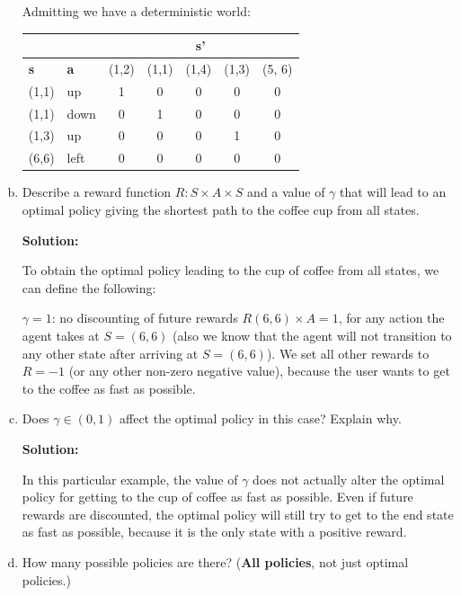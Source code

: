 \documentclass[12pt]{article}
\begin{document}
\begin{enumerate}[a)]
Admitting we have a deterministic world:

  \begin{center}
    \begin{tabular}{|l|l|c|c|c|c|c|}\hline
      \multicolumn{2}{|c|}{} &
                               \multicolumn{5}{|c|}{\textbf{s'}}\\\hline
      \textbf{s} & \textbf{a} & (1,2) & (1,1) & (1,4) & (1,3) & (5, 6)\\\hline
      (1,1) & up & 1 & 0 & 0 & 0 & 0 \\ \hline
      (1,1) & down & 0 & 1 & 0 & 0 & 0 \\ \hline
      (1,3) & up & 0 & 0 & 0 & 1 & 0 \\ \hline
      (6,6) & left & 0 & 0 & 0 & 0 & 0 \\ \hline
    \end{tabular}
  \end{center}

\item Describe a reward function $R : S \times A \times S$ 
  and a value of $\gamma$ that
  will lead to an optimal policy giving the shortest path to the coffee cup from
  all states.

\textbf{Solution:}

To obtain the optimal policy leading to the cup of coffee from all states, we can define the following:

$\gamma=1$: no discounting of future rewards
$R (6,6) \times A =1$, for any action the agent takes at $S=(6,6)$ (also we know that the agent will not transition to any other state after arriving at  $S=(6,6)$). We set all other rewards to $R=-1$ (or any other non-zero negative value), because the user wants to get to the coffee as fast as possible.

\item Does $\gamma \in (0, 1)$ affect the optimal policy in this case?
  Explain why.

\textbf{Solution:}

In this particular example, the value of $\gamma$ does not actually alter the optimal policy for getting to the cup of coffee as fast as possible. Even if future rewards are discounted, the optimal policy will still try to get to the end state as fast as possible, because it is the only state with a positive reward. 

\item How many possible policies are there?  (\textbf{All policies},
  not just optimal policies.)


\end{enumerate}
\end{document}
